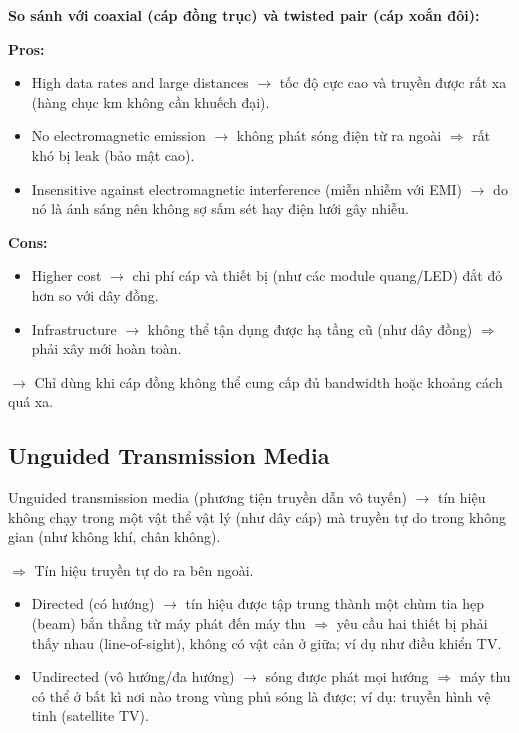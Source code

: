 \noindent
\textbf{So sánh với coaxial (cáp đồng trục) và twisted pair (cáp xoắn đôi):}
\medskip

\noindent
\textbf{Pros:}

\begin{itemize}
    \item High data rates and large distances $\rightarrow$ tốc độ cực cao và truyền được rất xa (hàng chục km không cần khuếch đại).
    \item No electromagnetic emission $\rightarrow$ không phát sóng điện từ ra ngoài $\Rightarrow$ rất khó bị leak (bảo mật cao).
    \item Insensitive against electromagnetic interference (miễn nhiễm với EMI) $\rightarrow$ do nó là ánh sáng nên không sợ sấm sét hay điện lưới gây nhiễu.
\end{itemize}
\medskip

\textbf{Cons:}

\begin{itemize}
    \item Higher cost $\rightarrow$ chi phí cáp và thiết bị (như các module quang/LED) đắt đỏ hơn so với dây đồng.
    \item Infrastructure $\rightarrow$ không thể tận dụng được hạ tầng cũ (như dây đồng) $\Rightarrow$ phải xây mới hoàn toàn.
\end{itemize}

\noindent
$\rightarrow$ Chỉ dùng khi cáp đồng không thể cung cấp đủ bandwidth hoặc khoảng cách quá xa.
\medskip

\pagebreak

\subsection{Unguided Transmission Media}

\noindent
Unguided transmission media (phương tiện truyền dẫn vô tuyến) $\rightarrow$ tín hiệu không chạy trong một vật thể vật lý (như dây cáp) mà truyền tự do trong không gian (như không khí, chân không).

$\Rightarrow$ Tín hiệu truyền tự do ra bên ngoài.

\begin{itemize}
    \item Directed (có hướng) $\rightarrow$ tín hiệu được tập trung thành một chùm tia hẹp (beam) bắn thẳng từ máy phát đến máy thu $\Rightarrow$ yêu cầu hai thiết bị phải thấy nhau (line-of-sight), không có vật cản ở giữa; ví dụ như điều khiển TV.
    \item Undirected (vô hướng/đa hướng) $\rightarrow$ sóng được phát mọi hướng $\Rightarrow$ máy thu có thể ở bất kì nơi nào trong vùng phủ sóng là được; ví dụ: truyền hình vệ tinh (satellite TV).
\end{itemize}
\medskip

